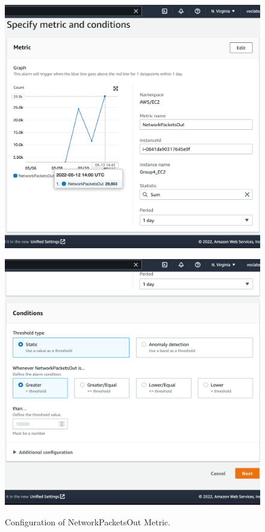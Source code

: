 \begin{figure}[!htbp]
    \centering
    \begin{minipage}{.5\textwidth}
        \centering
        \includegraphics[width=1\linewidth]{resources/cloudwatch/cloudwatch-metric-config-1}
        \label{fig:cloudwatch-metrics-config-1}
    \end{minipage}%
    \begin{minipage}{.5\textwidth}
        \centering
        \includegraphics[width=1\linewidth]{resources/cloudwatch/cloudwatch-metric-config-2}
        \label{fig:cloudwatch-metrics-config-2}
    \end{minipage}
    \caption{Configuration of NetworkPacketsOut Metric.}
    \label{fig:cloudwatch-metrics-config}
\end{figure}

